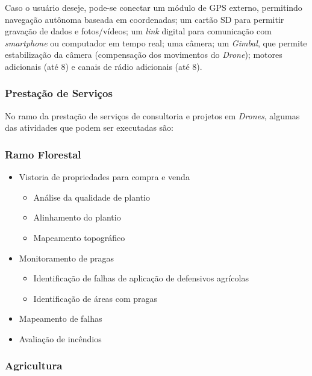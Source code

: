 Caso o usuário deseje, pode-se conectar um módulo de GPS externo, 
permitindo navegação autônoma baseada em coordenadas; um cartão
SD para permitir gravação de dados e fotos/vídeos; um \emph{link}
digital para comunicação com \emph{smartphone} ou computador em 
tempo real; uma câmera; um \emph{Gimbal}, que permite estabilização 
da câmera (compensação dos movimentos do \emph{Drone}); motores 
adicionais (até 8) e canais de rádio adicionais (até 8).

\subsubsection*{Prestação de Serviços}

No ramo da prestação de serviços de consultoria e projetos em \emph{Drones},
algumas das atividades que podem ser executadas são:

\subsubsection*{Ramo Florestal}

\begin{itemize}
	\item Vistoria de propriedades para compra e venda
	\begin{itemize}
		\item Análise da qualidade de plantio
		\item Alinhamento do plantio
		\item Mapeamento topográfico
	\end{itemize}
	\item Monitoramento de pragas
	\begin{itemize}
		\item Identificação de falhas de aplicação de defensivos agrícolas
		\item Identificação de áreas com pragas
	\end{itemize}
	\item Mapeamento de falhas
	\item Avaliação de incêndios
\end{itemize}

\subsubsection*{Agricultura}


